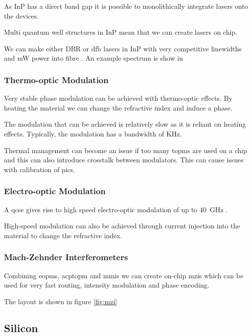 As \ac{InP} has a direct band gap it is possible to monolithically integrate lasers onto the devices. 

Multi quantum well structures in \ac{InP} mean that we can create lasers on chip.

We can make either \ac{DBR} or \ac{dfb} lasers in \ac{InP} with very competitive linewidths and mW power into fibre \cite{jeppix}. An example spectrum is show in 

\subsubsection*{Thermo-optic Modulation}

Very stable phase modulation can be achieved with thermo-optic effects. By heating the material we can change the refractive index and induce a phase.

The modulation that can be achieved is relatively slow as it is reliant on heating effects. Typically, the modulation has a bandwidth of KHz. 

Thermal management can become an issue if too many \acp{topm} are used on a chip and this can also introduce crosstalk between modulators. This can cause issues with calibration of \acp{pic}.

\subsubsection*{Electro-optic Modulation}

A \ac{qcse} gives rise to high speed electro-optic modulation of up to \SI{40}{GHz} \cite{jeppix}.

High-speed modulation can also be achieved through current injection into the material to change the refractive index. 

\subsubsection*{Mach-Zehnder Interferometers}

Combining \acp{eopm}, acp{topm} and \acp{mmi} we can create on-chip \acp{mzi} which can be used for very fast routing, intensity modulation and phase encoding. 

The layout is shown in figure \ref{fig:mzi}

\subsection{Silicon}

